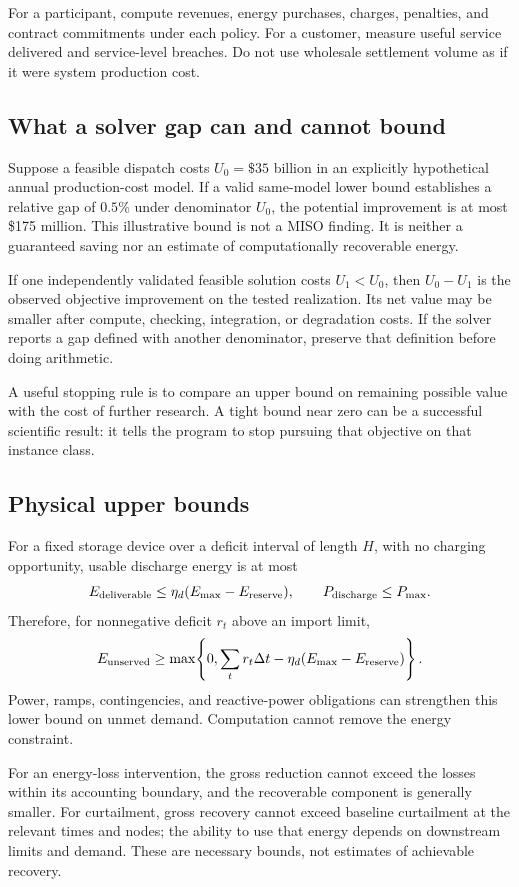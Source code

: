 \documentclass[11pt,letterpaper]{article}
\begin{document}
For a participant, compute revenues, energy purchases, charges, penalties, and contract commitments under each policy. For a customer, measure useful service delivered and service-level breaches. Do not use wholesale settlement volume as if it were system production cost.

\subsection{What a solver gap can and cannot bound}
Suppose a feasible dispatch costs $U_0=\$35$ billion in an explicitly hypothetical annual production-cost model. If a valid same-model lower bound establishes a relative gap of $0.5\%$ under denominator $U_0$, the potential improvement is at most \$175 million. This illustrative bound is not a MISO finding. It is neither a guaranteed saving nor an estimate of computationally recoverable energy.

If one independently validated feasible solution costs $U_1<U_0$, then $U_0-U_1$ is the observed objective improvement on the tested realization. Its net value may be smaller after compute, checking, integration, or degradation costs. If the solver reports a gap defined with another denominator, preserve that definition before doing arithmetic.

A useful stopping rule is to compare an upper bound on remaining possible value with the cost of further research. A tight bound near zero can be a successful scientific result: it tells the program to stop pursuing that objective on that instance class.

\subsection{Physical upper bounds}
For a fixed storage device over a deficit interval of length $H$, with no charging opportunity, usable discharge energy is at most
\[
 E_{\rm deliverable}\le \eta_d(E_{\max}-E_{\rm reserve}),
 \qquad P_{\rm discharge}\le P_{\max}.
\]
Therefore, for nonnegative deficit $r_t$ above an import limit,
\begin{equation}
 E_{\rm unserved}\ge
 \max\!\left\{0,\sum_t r_t\Delta t-
       \eta_d(E_{\max}-E_{\rm reserve})\right\}.
 \label{eq:storagebound}
\end{equation}
Power, ramps, contingencies, and reactive-power obligations can strengthen this lower bound on unmet demand. Computation cannot remove the energy constraint.

For an energy-loss intervention, the gross reduction cannot exceed the losses within its accounting boundary, and the recoverable component is generally smaller. For curtailment, gross recovery cannot exceed baseline curtailment at the relevant times and nodes; the ability to use that energy depends on downstream limits and demand. These are necessary bounds, not estimates of achievable recovery.
\end{document}
